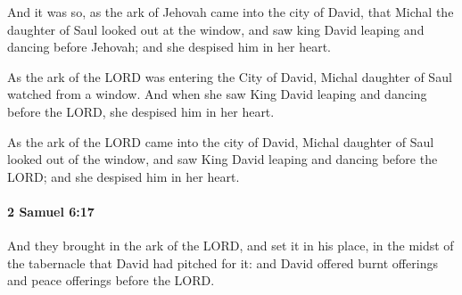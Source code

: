 			\begin{versebox}
					\item[BHS] 
					\item[ASV] And it was so, as the ark of Jehovah came into the city of David, that Michal the daughter of Saul looked out at the window, and saw king David leaping and dancing before Jehovah; and she despised him in her heart.
					\item[NIV] As the ark of the LORD was entering the City of David, Michal daughter of Saul watched from a window. And when she saw King David leaping and dancing before the LORD, she despised him in her heart.
					\item[NRSV] As the ark of the LORD came into the city of David, Michal daughter of Saul looked out of the window, and saw King David leaping and dancing before the LORD; and she despised him in her heart.
			\end{versebox}

		\paragraph{2 Samuel 6:17} %
			\label{2SAMUEL-6-17}

			And they brought in the ark of the LORD, and set it in his place, in the midst of the tabernacle that David had pitched for it: and David offered burnt offerings and peace offerings before the LORD.

